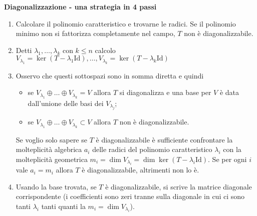 \documentclass[9pt, a4paper]{article}
\newcommand{\Id}{\mathrm{Id}}
\theoremstyle{mythm}
\begin{document}
\begin{framed}
	\begin{center}
		\textbf{Diagonalizzazione - una strategia in 4 passi}
	\end{center}
	\begin{enumerate}
		\item Calcolare il polinomio caratteristico e trovarne le radici. Se il polinomio minimo non si fattorizza completamente nel campo, $ T $ non è diagonalizzabile. 
		\item Detti $ \lambda_1, \ldots, \lambda_k $ con $ k \leq n $ calcolo $ V_{\lambda_1} = \ker(T - \lambda_1 \Id), \ldots, V_{\lambda_k} = \ker(T - \lambda_k \Id) $
		\item Osservo che questi sottospazi sono in somma diretta e quindi 
			\begin{itemize}
				\item se $ V_{\lambda_1} \oplus \ldots \oplus V_{\lambda_k} = V $ allora $ T $ si diagonalizza e una base per $ V $ è data dall'unione delle basi dei $ V_{\lambda_j} $;
				\item se $ V_{\lambda_1} \oplus \ldots \oplus V_{\lambda_k} \subset V $ allora $ T $ non è diagonalizzabile.
			\end{itemize} 
		Se voglio solo sapere se $ T $ è diagonalizzabile è sufficiente confrontare la molteplicità algebrica $ a_i $ delle radici del polinomio caratteristico $ \lambda_i $ con la molteplicità geometrica $ m_i = \dim V_{\lambda_i} = \dim \ker (T - \lambda_i \Id) $. Se per ogni $ i $ vale $ a_i = m_i $ allora $ T $ è diagonalizzabile, altrimenti non lo è. 
		\item Usando la base trovata, se $ T $ è diagonalizzabile, si scrive la matrice diagonale corrispondente (i coefficienti sono zeri tranne sulla diagonale in cui ci sono tanti $ \lambda_i $ tanti quanti la $ m_i = \dim V_{\lambda_i} $). 
	\end{enumerate} 
\end{framed}
\end{document}
